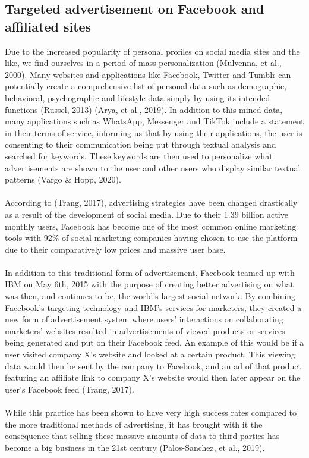 \documentclass[11pt]{article}
\begin{document}
\subsection{Targeted advertisement on Facebook and affiliated sites}
Due to the increased popularity of personal profiles on social media sites and the like, we find ourselves in a period of mass personalization (Mulvenna, et al., 2000). Many websites and applications like Facebook, Twitter and Tumblr can potentially create a comprehensive list of personal data such as demographic, behavioral, psychographic and lifestyle-data simply by using its intended functions (Russel, 2013) (Arya, et al., 2019). In addition to this mined data, many applications such as WhatsApp, Messenger and TikTok include a statement in their terms of service, informing us that by using their applications, the user is consenting to their communication being put through textual analysis and searched for keywords. These keywords are then used to personalize what advertisements are shown to the user and other users who display similar textual patterns (Vargo \& Hopp, 2020). 
\\ \\
According to (Trang, 2017), advertising strategies have been changed drastically as a result of the development of social media. Due to their 1.39 billion active monthly users, Facebook has become one of the most common online marketing tools with 92\% of social marketing companies having chosen to use the platform due to their comparatively low prices and massive user base.  
\\ \\
In addition to this traditional form of advertisement, Facebook teamed up with IBM on May 6th, 2015 with the purpose of creating better advertising on what was then, and continues to be, the world’s largest social network. By combining Facebook’s targeting technology and IBM’s services for marketers, they created a new form of advertisement system where users’ interactions on collaborating marketers’ websites resulted in advertisements of viewed products or services being generated and put on their Facebook feed. An example of this would be if a user visited company X’s website and looked at a certain product. This viewing data would then be sent by the company to Facebook, and an ad of that product featuring an affiliate link to company X’s website would then later appear on the user’s Facebook feed (Trang, 2017).  
\\ \\
While this practice has been shown to have very high success rates compared to the more traditional methods of advertising, it has brought with it the consequence that selling these massive amounts of data to third parties has become a big business in the 21st century (Palos-Sanchez, et al., 2019). 
\\
\end{document}
